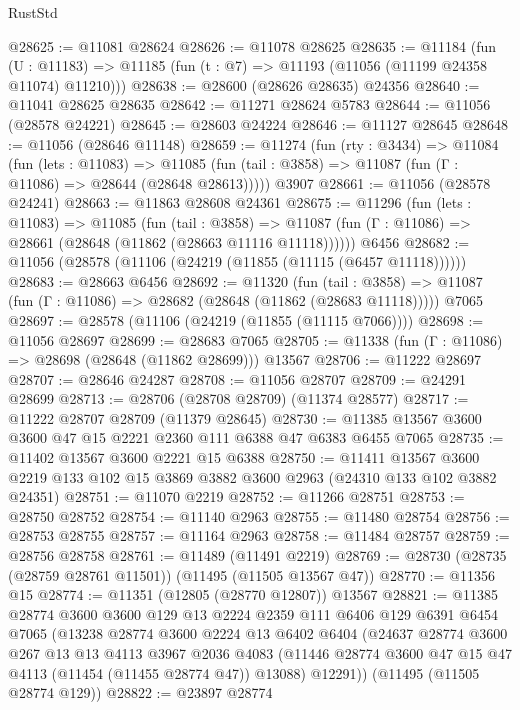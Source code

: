 \begin{lexlean}{RustStd}
\begin{coremodule}
@28625 := @11081 @28624
@28626 := @11078 @28625
@28635 := @11184
    (fun (U : @11183) => @11185 (fun (t : @7) => @11193 (@11056 (@11199 @24358 @11074) @11210)))
@28638 := @28600 (@28626 @28635) @24356
@28640 := @11041 @28625 @28635
@28642 := @11271 @28624 @5783
@28644 := @11056 (@28578 @24221)
@28645 := @28603 @24224
@28646 := @11127 @28645
@28648 := @11056 (@28646 @11148)
@28659 := @11274
    (fun (rty : @3434) =>
    @11084
      (fun (lets : @11083) =>
      @11085 (fun (tail : @3858) => @11087 (fun (Γ : @11086) => @28644 (@28648 @28613)))))
    @3907
@28661 := @11056 (@28578 @24241)
@28663 := @11863 @28608 @24361
@28675 := @11296
    (fun (lets : @11083) =>
    @11085
      (fun (tail : @3858) =>
      @11087 (fun (Γ : @11086) => @28661 (@28648 (@11862 (@28663 @11116 @11118))))))
    @6456
@28682 := @11056 (@28578 (@11106 (@24219 (@11855 (@11115 (@6457 @11118))))))
@28683 := @28663 @6456
@28692 := @11320
    (fun (tail : @3858) => @11087 (fun (Γ : @11086) => @28682 (@28648 (@11862 (@28683 @11118)))))
    @7065
@28697 := @28578 (@11106 (@24219 (@11855 (@11115 @7066))))
@28698 := @11056 @28697
@28699 := @28683 @7065
@28705 := @11338 (fun (Γ : @11086) => @28698 (@28648 (@11862 @28699))) @13567
@28706 := @11222 @28697
@28707 := @28646 @24287
@28708 := @11056 @28707
@28709 := @24291 @28699
@28713 := @28706 (@28708 @28709) (@11374 @28577)
@28717 := @11222 @28707 @28709 (@11379 @28645)
@28730 := @11385 @13567 @3600 @3600 @47 @15 @2221 @2360 @111 @6388 @47 @6383 @6455 @7065
@28735 := @11402 @13567 @3600 @2221 @15 @6388
@28750 := @11411
    @13567
    @3600
    @2219
    @133
    @102
    @15
    @3869
    @3882
    @3600
    @2963
    (@24310 @133 @102 @3882 @24351)
@28751 := @11070 @2219
@28752 := @11266 @28751
@28753 := @28750 @28752
@28754 := @11140 @2963
@28755 := @11480 @28754
@28756 := @28753 @28755
@28757 := @11164 @2963
@28758 := @11484 @28757
@28759 := @28756 @28758
@28761 := @11489 (@11491 @2219)
@28769 := @28730 (@28735 (@28759 @28761 @11501)) (@11495 (@11505 @13567 @47))
@28770 := @11356 @15
@28774 := @11351 (@12805 (@28770 @12807)) @13567
@28821 := @11385
    @28774
    @3600
    @3600
    @129
    @13
    @2224
    @2359
    @111
    @6406
    @129
    @6391
    @6454
    @7065
    (@13238
      @28774
      @3600
      @2224
      @13
      @6402
      @6404
      (@24637
        @28774
        @3600
        @267
        @13
        @13
        @4113
        @3967
        @2036
        @4083
        (@11446 @28774 @3600 @47 @15 @47 @4113 (@11454 (@11455 @28774 @47)) @13088)
        @12291))
    (@11495 (@11505 @28774 @129))
@28822 := @23897 @28774

\end{coremodule}
\end{lexlean}
